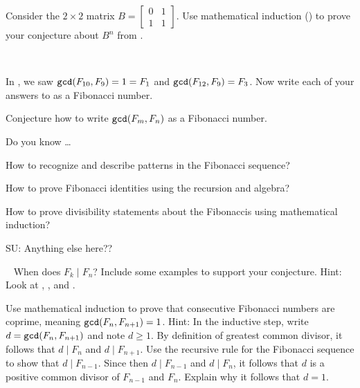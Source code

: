 \begin{exer}[\exerU] %
\label{exer_fib_matrix_another_proof}
    Consider the $2 \times 2$ matrix $B= \left[ \begin{array}{cc} 0 & 1\\ 1 & 1 \end{array} \right]$.  Use mathematical induction () to prove your conjecture about $B^n$ from .   
\end{exer}

\begin{exer}
\label{exer_fib_gcd_conj}
~
    \begin{exerpart}
        \item In , we saw $\texttt{gcd}(F_{10},F_{9}) = 1 = F_1$ and $\texttt{gcd}(F_{12},F_9)=F_3$.  Now write each of your answers to  as a Fibonacci number.
        \item Conjecture how to write $\texttt{gcd}(F_m,F_n)$ as a Fibonacci number.
    \end{exerpart}
\end{exer}

\begin{exer}[\exerR] %
\label{exer_dyk_fib_patterns}
    Do you know \ldots
        \begin{exerpart}
            \item How to recognize and describe patterns in the Fibonacci sequence?
            \item How to prove Fibonacci identities using the recursion and algebra?
            \item How to prove divisibility statements about the Fibonaccis using mathematical induction?
            \item SU: Anything else here??
        \end{exerpart}
\end{exer}

\begin{exer}[\exerE] %
\label{exer_fib_gen_div_conj}
~
    When does $F_k \mid F_n$?  Include some examples to support your conjecture.  Hint: Look at , , and .
\end{exer}

\begin{exer}[\exerE] %
\label{exer_consec_fib_coprime_proof}
    Use mathematical induction to prove that consecutive Fibonacci numbers are coprime, meaning $\texttt{gcd}(F_n,F_{n+1})=1$.  Hint: In the inductive step, write $d = \texttt{gcd}(F_n,F_{n+1})$ and note $d \ge 1$.  By definition of greatest common divisor, it follows that $d \mid F_n$ and $d \mid F_{n+1}$. Use the recursive rule for the Fibonacci sequence to show that $d \mid F_{n-1}$. Since then $d \mid F_{n-1}$ and $d \mid F_n$, it follows that $d$ is a positive common divisor of $F_{n-1}$ and $F_n$.  Explain why it follows that $d=1$.
\end{exer}

